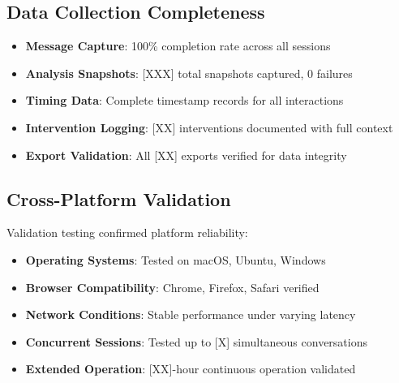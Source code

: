 \documentclass[11pt,letterpaper]{article}
\begin{document}
\subsection{Data Collection Completeness}

\begin{itemize}
    \item \textbf{Message Capture}: 100\% completion rate across all sessions
    \item \textbf{Analysis Snapshots}: [XXX] total snapshots captured, 0 failures
    \item \textbf{Timing Data}: Complete timestamp records for all interactions
    \item \textbf{Intervention Logging}: [XX] interventions documented with full context
    \item \textbf{Export Validation}: All [XX] exports verified for data integrity
\end{itemize}

\subsection{Cross-Platform Validation}

Validation testing confirmed platform reliability:

\begin{itemize}
    \item \textbf{Operating Systems}: Tested on macOS, Ubuntu, Windows
    \item \textbf{Browser Compatibility}: Chrome, Firefox, Safari verified
    \item \textbf{Network Conditions}: Stable performance under varying latency
    \item \textbf{Concurrent Sessions}: Tested up to [X] simultaneous conversations
    \item \textbf{Extended Operation}: [XX]-hour continuous operation validated
\end{itemize}
\end{document}
